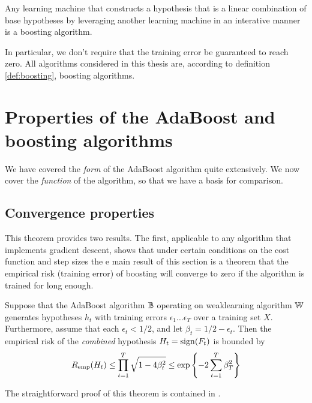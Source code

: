 \begin{definition}
Any learning machine that constructs a hypothesis that is a linear
combination of base hypotheses by leveraging another learning machine
in an interative manner is a boosting algorithm.
\end{definition}

In particular, we don't require that the training error be guaranteed
to reach zero.  All algorithms considered in this thesis are,
according to definition \ref{def:boosting}, boosting algorithms.


\section{Properties of the AdaBoost and boosting algorithms}

We have covered the \emph{form} of the AdaBoost algorithm quite
extensively.  We now cover the \emph{function} of the algorithm, so
that we have a basis for comparison.

\subsection{Convergence properties}

This theorem provides two results.  The first, applicable to any
algorithm that implements gradient descent, shows that under certain
conditions on the cost function and step sizes the 
e main result of this section is a theorem that the empirical risk
(training error) of boosting will converge to zero if the algorithm is
trained for long enough.

\begin{theorem}
\label{thm:AdaBoost training error convergence}
Suppose that the AdaBoost algorithm $\mathbb{B}$ operating on weaklearning
algorithm $\mathbb{W}$ generates hypotheses $h_t$ with training errors
$\epsilon_1 \ldots \epsilon_T$ over a training set $X$.  Furthermore,
assume that each $\epsilon_t < 1/2$, and let $\beta_t = 1/2 -
\epsilon_t$.  Then the empirical risk of the \emph{combined}
hypothesis $H_t = \mathrm{sign}(F_t)$ is bounded by
%
\begin{equation}
R_{\mathrm{emp}}(H_t) \leq \prod_{t=1}^{T} \sqrt{1 - 4 \beta_t^2} \leq \exp
\left\{ - 2 \sum_{t=1}^T \beta_T^2 \right\}
\end{equation}
\end{theorem}

\proof The straightforward proof of this theorem is contained in
\cite{Freund97}.

